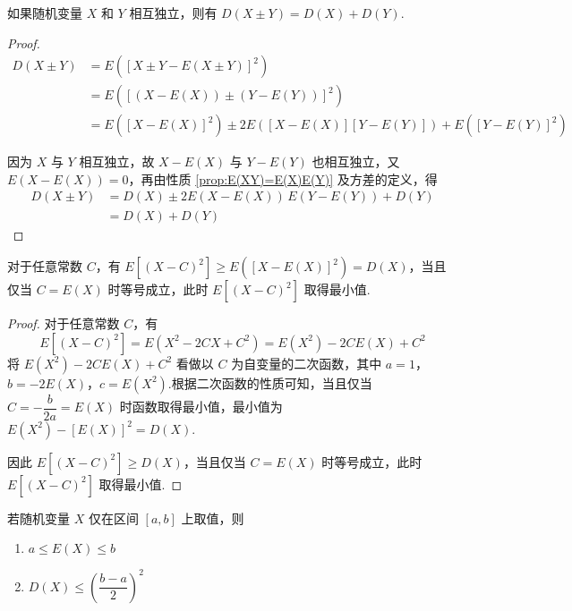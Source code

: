 \begin{property}[][][prop:D(X+Y)=D(X)+D(Y)]
    \indent 如果随机变量 $X$ 和 $Y$ 相互独立，则有 $D(X \pm Y) = D(X)+D(Y)$.
\end{property}

\begin{proof}
    $$
    \begin{aligned}
        D(X \pm Y) &= E([X \pm Y - E(X \pm Y)]^2) \\
        &= E([(X-E(X)) \pm (Y-E(Y))]^2) \\
        &= E([X-E(X)]^2) \pm 2E([X-E(X)][Y-E(Y)]) + E([Y-E(Y)]^2)
    \end{aligned}
    $$

    因为 $X$ 与 $Y$ 相互独立，故 $X-E(X)$ 与 $Y-E(Y)$ 也相互独立，又 $E(X-E(X)) = 0$，再由性质 \ref{prop:E(XY)=E(X)E(Y)} 及方差的定义，得
    $$
    \begin{aligned}
        D(X \pm Y) &= D(X) \pm 2E(X-E(X)) \, E(Y-E(Y)) + D(Y) \\
        &= D(X) + D(Y)
    \end{aligned}
    $$
\end{proof}

\begin{conclusion}
    \indent 对于任意常数 $C$，有 $E[(X-C)^2] \geqslant E([X-E(X)]^2) = D(X)$，当且仅当 $C=E(X)$ 时等号成立，此时 $E[(X-C)^2]$ 取得最小值.
\end{conclusion}

\begin{proof}
    对于任意常数 $C$，有
    $$
    E[(X-C)^2] = E(X^2 - 2CX + C^2) = E(X^2) - 2CE(X) + C^2
    $$
    将 $E(X^2) - 2CE(X) + C^2$ 看做以 $C$ 为自变量的二次函数，其中 $a=1$，$b=-2E(X)$，$c=E(X^2)$.根据二次函数的性质可知，当且仅当 $C=-\dfrac{b}{2a}=E(X)$ 时函数取得最小值，最小值为 $E(X^2) - [E(X)]^2 = D(X)$.
    
    因此 $E[(X-C)^2] \geqslant D(X)$，当且仅当 $C=E(X)$ 时等号成立，此时 $E[(X-C)^2]$ 取得最小值.
\end{proof}

\begin{conclusion}
    \indent 若随机变量 $X$ 仅在区间 $[a,b]$ 上取值，则
    \begin{enumerate}
        \item $a \leqslant E(X) \leqslant b$
        \item $D(X) \leqslant \left( \dfrac{b-a}{2} \right)^2$
    \end{enumerate}
\end{conclusion}

